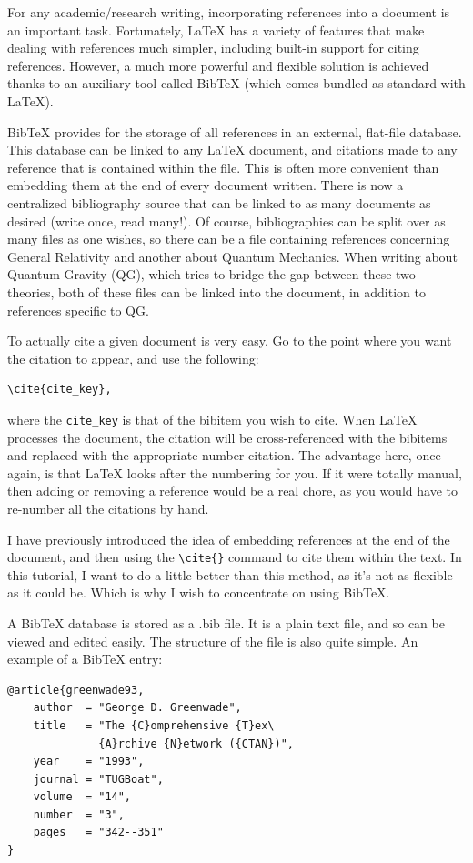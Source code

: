 \documentclass[english,ngerman,paper=a5,headsepline=true,9pt,DIV=12,BCOR=0.7cm]{scrbook}
\begin{document}
For any academic/research writing, incorporating
references into a document is an important task. Fortunately, LaTeX
has a variety of features that make dealing with references much
simpler, including built-in support for citing references. However, a
much more powerful and flexible solution is achieved thanks to an
auxiliary tool called BibTeX (which comes bundled as standard with
LaTeX).

BibTeX provides for the storage of all references in an external,
flat-file database. This database can be linked to any LaTeX document,
and citations made to any reference that is contained within the
file. This is often more convenient than embedding them at the end of
every document written. There is now a centralized bibliography source
that can be linked to as many documents as desired (write once, read
many!). Of course, bibliographies can be split over as many files as
one wishes, so there can be a file containing references concerning
General Relativity and another about Quantum Mechanics. When writing
about Quantum Gravity (QG), which tries to bridge the gap between
these two theories, both of these files can be linked into the
document, in addition to references specific to QG.

To actually cite a given document is very easy. Go to the point where
you want the citation to appear, and use the following:
\begin{verbatim}
\cite{cite_key},
\end{verbatim}
where the \texttt{cite\_key} is that of the bibitem you wish to
cite. When LaTeX processes the document, the citation will be
cross-referenced with the bibitems and replaced with the appropriate
number citation. The advantage here, once again, is that LaTeX looks
after the numbering for you. If it were totally manual, then adding or
removing a reference would be a real chore, as you would have to
re-number all the citations by hand.

I have previously introduced the idea of embedding references at the
end of the document, and then using the \verb|\cite{}| command to cite them
within the text. In this tutorial, I want to do a little better than
this method, as it's not as flexible as it could be. Which is why I
wish to concentrate on using BibTeX.

A BibTeX database is stored as a .bib file. It is a plain text file,
and so can be viewed and edited easily. The structure of the file is
also quite simple. An example of a BibTeX entry:
\begin{verbatim}
@article{greenwade93,
    author  = "George D. Greenwade",
    title   = "The {C}omprehensive {T}ex\
              {A}rchive {N}etwork ({CTAN})",
    year    = "1993",
    journal = "TUGBoat",
    volume  = "14",
    number  = "3",
    pages   = "342--351"
}
\end{verbatim}
\end{document}
